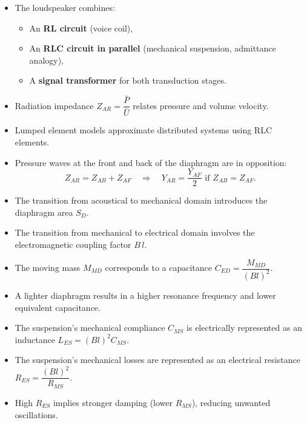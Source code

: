 \begin{tcolorbox}[colback=gray!10!white,colframe=black,title=\textbf{Summary – Loudspeaker Equivalent Model}]
\begin{itemize}
    \item The loudspeaker combines:
    \begin{itemize}
        \item An \textbf{RL circuit} (voice coil),
        \item An \textbf{RLC circuit in parallel} (mechanical suspension, admittance analogy),
        \item A \textbf{signal transformer} for both transduction stages.
    \end{itemize}
    \item Radiation impedance \( Z_{AR} = \dfrac{\bar{P}}{\bar{U}} \) relates pressure and volume velocity.
    \item Lumped element models approximate distributed systems using RLC elements.
    \item Pressure waves at the front and back of the diaphragm are in opposition:
    \[
    Z_{AR} = Z_{AB} + Z_{AF} \quad \Rightarrow \quad Y_{AR} = \frac{Y_{AF}}{2} \text{ if } Z_{AB} = Z_{AF}.
    \]
\end{itemize}
\end{tcolorbox}


\begin{tcolorbox}[colback=gray!5,colframe=gray!50!black,title=Key Points]
\begin{itemize}
    \item The transition from acoustical to mechanical domain introduces the diaphragm area \( S_D \).
    \item The transition from mechanical to electrical domain involves the electromagnetic coupling factor \( B \, l \).
    \item The moving mass \( M_{MD} \) corresponds to a capacitance \( C_{ED} = \dfrac{M_{MD}}{(B l)^2} \).
    \item A lighter diaphragm results in a higher resonance frequency and lower equivalent capacitance.
\end{itemize}
\end{tcolorbox}


\begin{tcolorbox}[colback=gray!5,colframe=gray!50!black,title=Key Points]
\begin{itemize}
    \item The suspension’s mechanical compliance \( C_{MS} \) is electrically represented as an inductance \( L_{ES} = (B l)^2 C_{MS} \).
    \item The suspension’s mechanical losses are represented as an electrical resistance \( R_{ES} = \dfrac{(B l)^2}{R_{MS}} \).
    \item High \( R_{ES} \) implies stronger damping (lower \( R_{MS} \)), reducing unwanted oscillations.
\end{itemize}
\end{tcolorbox}


